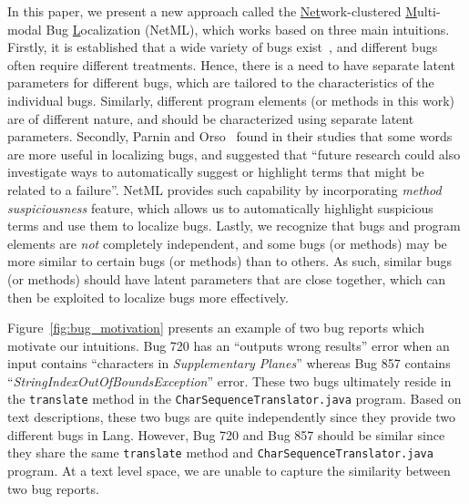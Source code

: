 In this paper, we present a new approach called the \underline{Net}work-clustered \underline{M}ulti-modal Bug \underline{L}ocalization (NetML), which works based on three main intuitions. Firstly, it is established that a wide variety of bugs exist~\cite{ThungWLJ12,XiaZLZ13}, and different bugs often require different treatments. Hence, there is a need to have separate latent parameters for different bugs, which are tailored to the characteristics of the individual bugs. Similarly, different program elements (or methods in this work) are of different nature, and should be characterized using separate latent parameters. Secondly, Parnin and Orso~\cite{ParninO11} found in their studies that some words are more useful in localizing bugs, and suggested that ``future research could also investigate ways to automatically suggest or highlight terms that might be related to a failure''. NetML provides such capability by incorporating \emph{method suspiciousness} feature, which allows us to automatically highlight suspicious terms and use them to localize bugs. Lastly, we recognize that bugs and program elements are \emph{not} completely independent, and some bugs (or methods) may be more similar to certain bugs (or methods) than to others. As such, similar bugs (or methods) should have latent parameters that are close together, which can then be exploited to localize bugs more effectively. 

Figure~\ref{fig:bug_motivation} presents an example of two bug reports which motivate our intuitions. Bug 720 has an ``outputs wrong results'' error when an input contains ``characters in \textit{Supplementary Planes}'' whereas Bug 857 contains ``\textit{StringIndexOutOfBoundsException}'' error. These two bugs ultimately reside in the \texttt{translate} method in the \texttt{CharSequenceTranslator.java} program. Based on text descriptions, these two bugs are quite independently since they provide two different bugs in Lang. However, Bug 720 and Bug 857 should be similar since they share the same \texttt{translate} method and \texttt{CharSequenceTranslator.java} program. At a text level space, we are unable to capture the similarity between two bug reports. 

